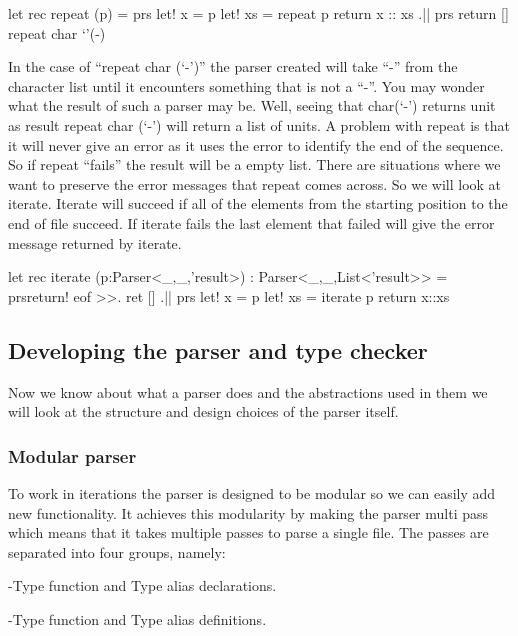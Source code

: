 \begin{code}
	let rec repeat (p) = 
		prs{ 
			let! x = p 
			let! xs = repeat p 
			return x :: xs 
		} .|| prs {return []} 
	repeat char ‘’(-) 
\end{code}

In the case of “repeat char (‘-’)” the parser created will take “-” from the character list until it encounters something that is not a “-”. You may wonder what the result of such a parser may be. Well, seeing that char(‘-’) returns unit as result repeat char (‘-’) will return a list of units. 
\linebreak
A problem with repeat is that it will never give an error as it uses the error to identify the end of the sequence. So if repeat “fails” the result will be a empty list. There are situations where we want to preserve the error messages that repeat comes across. 
\linebreak
So we will look at iterate. Iterate will succeed if all of the elements from the starting position to the end of file succeed. If iterate fails the last element that failed will give the error message returned by iterate. 

\begin{code}
	let rec iterate (p:Parser<_,_,'result>) : Parser<_,_,List<'result>> = 
	prs{return! eof >>. ret []} .|| 
	prs{ 
		let! x = p 
		let! xs = iterate p 
		return x::xs 
	}
\end{code}

\subsection{Developing the parser and type checker}
Now we know about what a parser does and the abstractions used in them we will look at the structure and design choices of the parser itself.

\subsubsection{Modular parser}

To work in iterations the parser is designed to be modular so we can easily add new functionality. It achieves this modularity by making the parser multi pass which means that it takes multiple passes to parse a single file.
\linebreak
The passes are separated into four groups, namely:

-Type function and Type alias declarations.

-Type function and Type alias definitions.

